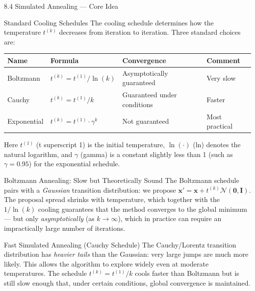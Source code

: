 \documentclass[aspectratio=169,10pt]{beamer}
\begin{document}
\begin{frame}[allowframebreaks]{8.4 Simulated Annealing --- Core Idea}
\framebreak

\begin{block}{Standard Cooling Schedules}
The cooling schedule determines how the temperature $t^{(k)}$ decreases from iteration to iteration. Three standard choices are:

\medskip
\begin{center}
\begin{tabular}{llll}
\toprule
Name & Formula & Convergence & Comment \\
\midrule
Boltzmann & $t^{(k)} = t^{(1)} / \ln(k)$ & Asymptotically guaranteed & Very slow \\
Cauchy & $t^{(k)} = t^{(1)} / k$ & Guaranteed under conditions & Faster \\
Exponential & $t^{(k)} = t^{(1)} \cdot \gamma^k$ & Not guaranteed & Most practical \\
\bottomrule
\end{tabular}
\end{center}
\medskip
Here $t^{(1)}$ (t superscript 1) is the initial temperature, $\ln(\cdot)$ (ln) denotes the natural logarithm, and $\gamma$ (gamma) is a constant slightly less than 1 (such as $\gamma = 0.95$) for the exponential schedule.
\end{block}

\begin{block}{Boltzmann Annealing: Slow but Theoretically Sound}
The Boltzmann schedule pairs with a \emph{Gaussian} transition distribution: we propose $\mathbf{x}' = \mathbf{x} + t^{(k)} \mathcal{N}(\mathbf{0}, \mathbf{I})$.
The proposal spread shrinks with temperature, which together with the $1/\ln(k)$ cooling guarantees that the method converges to the global minimum --- but only \emph{asymptotically} (as $k \to \infty$), which in practice can require an impractically large number of iterations.
\end{block}

\begin{block}{Fast Simulated Annealing (Cauchy Schedule)}
The Cauchy/Lorentz transition distribution has \emph{heavier tails} than the Gaussian: very large jumps are much more likely.
This allows the algorithm to explore widely even at moderate temperatures.
The schedule $t^{(k)} = t^{(1)}/k$ cools faster than Boltzmann but is still slow enough that, under certain conditions, global convergence is maintained.
\end{block}


\end{frame}
\end{document}
